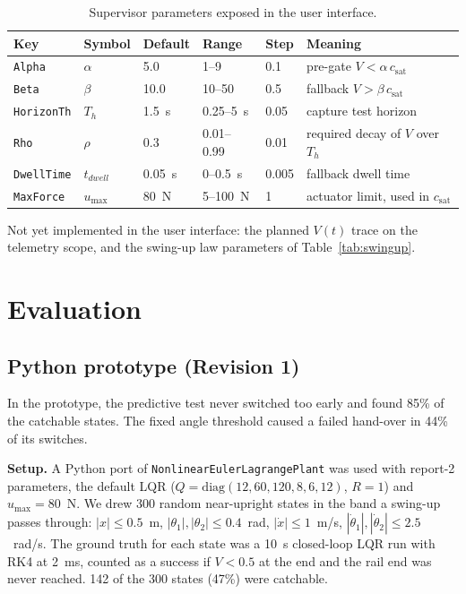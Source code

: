\documentclass[11pt,a4paper]{article}
\newcommand{\code}[1]{\texttt{#1}}
\newcommand{\csat}{c_{\mathrm{sat}}}
\newcommand{\umax}{u_{\max}}
\begin{document}
\begin{table}[h]
\centering
\begin{tabular}{@{}l l l l l l@{}}
\toprule
Key & Symbol & Default & Range & Step & Meaning \\
\midrule
\code{Alpha} & $\alpha$ & 5.0 & 1--9 & 0.1 & pre-gate $V < \alpha\,\csat$ \\
\code{Beta} & $\beta$ & 10.0 & 10--50 & 0.5 & fallback $V > \beta\,\csat$ \\
\code{HorizonTh} & $T_h$ & 1.5~s & 0.25--5~s & 0.05 & capture test horizon \\
\code{Rho} & $\rho$ & 0.3 & 0.01--0.99 & 0.01 & required decay of $V$ over $T_h$ \\
\code{DwellTime} & $t_{dwell}$ & 0.05~s & 0--0.5~s & 0.005 & fallback dwell time \\
\code{MaxForce} & $\umax$ & 80~N & 5--100~N & 1 & actuator limit, used in $\csat$ \\
\bottomrule
\end{tabular}
\caption{Supervisor parameters exposed in the user interface.}
\label{tab:uiparams}
\end{table}

Not yet implemented in the user interface: the planned $V(t)$ trace on the telemetry scope, and
the swing-up law parameters of Table~\ref{tab:swingup}.

\section{Evaluation}\label{sec:eval}
\subsection{Python prototype (Revision 1)}
In the prototype, the predictive test never switched too early and found 85\% of the
catchable states. The fixed angle threshold caused a failed hand-over in 44\% of its switches.

\textbf{Setup.} A Python port of \code{NonlinearEulerLagrangePlant} was used with report-2
parameters, the default LQR ($Q = \mathrm{diag}(12, 60, 120, 8, 6, 12)$, $R = 1$) and
$\umax = 80$~N. We drew 300 random near-upright states in the band a swing-up passes through:
$|x| \le 0.5$~m, $|\theta_1|, |\theta_2| \le 0.4$~rad, $|\dot x| \le 1$~m/s,
$|\dot\theta_1|, |\dot\theta_2| \le 2.5$~rad/s. The ground truth for each state was a 10~s
closed-loop LQR run with RK4 at 2~ms, counted as a success if $V < 0.5$ at the end and the
rail end was never reached. 142 of the 300 states (47\%) were catchable.
\end{document}
